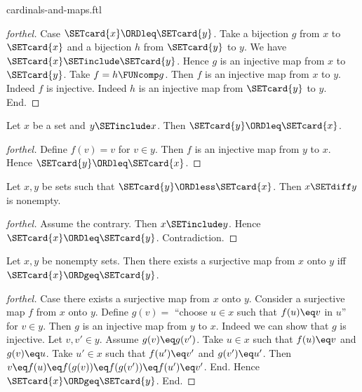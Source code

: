 \documentclass{naproche-library}
\begin{document}
\begin{smodule}[title=Cardinal Numbers and Maps]{cardinals-and-maps.ftl}
\begin{proof}[forthel]
  Case $\SETcard{x} \ORDleq \SETcard{y}$.
    Take a bijection $g$ from $x$ to $\SETcard{x}$ and a bijection $h$ from $\SETcard{y}$ to $y$.
    We have $\SETcard{x} \SETinclude \SETcard{y}$.
    Hence $g$ is an injective map from $x$ to $\SETcard{y}$.
    Take $f = h \FUNcomp g$.
    Then $f$ is an injective map from $x$ to $y$.
    Indeed $f$ is injective.
    Indeed $h$ is an injective map from $\SETcard{y}$ to $y$.
  End.
\end{proof}

\begin{corollary}[forthel,id=SET_THEORY_06_4944303633727488]
  Let $x$ be a set and $y \SETinclude x$.
  Then $\SETcard{y} \ORDleq \SETcard{x}$.
\end{corollary}
\begin{proof}[forthel]
  Define $f(v) = v$ for $v \in y$.
  Then $f$ is an injective map from $y$ to $x$.
  Hence $\SETcard{y} \ORDleq \SETcard{x}$.
\end{proof}

\begin{corollary}[forthel,id=SET_THEORY_06_7746592696172544]
  Let $x, y$ be sets such that $\SETcard{y} \ORDless \SETcard{x}$.
  Then $x \SETdiff y$ is nonempty.
\end{corollary}
\begin{proof}[forthel]
  Assume the contrary.
  Then $x \SETinclude y$.
  Hence $\SETcard{x} \ORDleq \SETcard{y}$.
  Contradiction.
\end{proof}

\begin{proposition}[forthel,id=SET_THEORY_06_192336220913664]
  Let $x, y$ be nonempty sets.
  Then there exists a surjective map from $x$ onto $y$ iff $\SETcard{x} \ORDgeq \SETcard{y}$.
\end{proposition}
\begin{proof}[forthel]
  Case there exists a surjective map from $x$ onto $y$.
    Consider a surjective map $f$ from $x$ onto $y$.
    Define $g(v) =$ ``choose $u \in x$ such that $f(u) \eq v$ in $u$'' for $v \in y$.
    Then $g$ is an injective map from $y$ to $x$.
    Indeed we can show that $g$ is injective.
      Let $v, v' \in y$.
      Assume $g(v) \eq g(v')$.
      Take $u \in x$ such that $f(u) \eq v$ and $g(v) \eq u$.
      Take $u' \in x$ such that $f(u') \eq v'$ and $g(v') \eq u'$.
      Then $v
        \eq f(u)
        \eq f(g(v))
        \eq f(g(v'))
        \eq f(u')
        \eq v'$.
    End.
    Hence $\SETcard{x} \ORDgeq \SETcard{y}$.
  End.


\end{proof}
\end{smodule}
\end{document}
